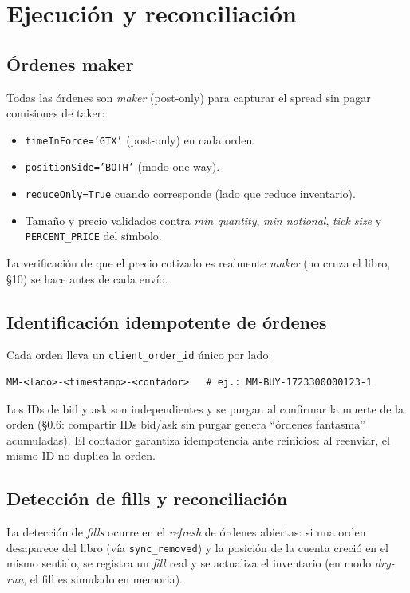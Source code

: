 \documentclass[11pt,a4paper]{article}
\newcommand{\codigo}[1]{\texttt{#1}}
\begin{document}
\section{Ejecución y reconciliación}

\subsection{Órdenes maker}
Todas las órdenes son \emph{maker} (post-only) para capturar el spread
sin pagar comisiones de taker:

\begin{itemize}
  \item \codigo{timeInForce='GTX'} (post-only) en cada orden.
  \item \codigo{positionSide='BOTH'} (modo one-way).
  \item \codigo{reduceOnly=True} cuando corresponde (lado que reduce
  inventario).
  \item Tamaño y precio validados contra \emph{min quantity}, \emph{min
  notional}, \emph{tick size} y \codigo{PERCENT\_PRICE} del símbolo.
\end{itemize}

La verificación de que el precio cotizado es realmente \emph{maker}
(no cruza el libro, §10) se hace antes de cada envío.

\subsection{Identificación idempotente de órdenes}
Cada orden lleva un \codigo{client\_order\_id} único por lado:

\begin{verbatim}
MM-<lado>-<timestamp>-<contador>   # ej.: MM-BUY-1723300000123-1
\end{verbatim}

Los IDs de bid y ask son independientes y se purgan al confirmar la
muerte de la orden (§0.6: compartir IDs bid/ask sin purgar genera
``órdenes fantasma'' acumuladas). El contador garantiza idempotencia
ante reinicios: al reenviar, el mismo ID no duplica la orden.

\subsection{Detección de fills y reconciliación}
La detección de \emph{fills} ocurre en el \emph{refresh} de órdenes
abiertas: si una orden desaparece del libro (vía
\codigo{sync\_removed}) y la posición de la cuenta creció en el mismo
sentido, se registra un \emph{fill} real y se actualiza el inventario
(en modo \emph{dry-run}, el fill es simulado en memoria).
\end{document}
